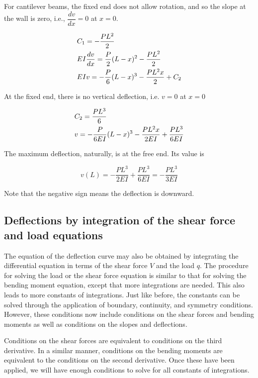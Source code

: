 \documentclass[
fontsize=10pt,
a4paper,
twosides=false,
open=any,
svgnames,
]{kaobook} %
\begin{document}
\begin{example}
For cantilever beams, the fixed end does not allow rotation, and so the slope at the wall is zero, i.e., $\dfrac{dv}{dx} = 0$ at $x = 0$.

\begin{gather*}
  C_1 =  - \frac{PL^2}{2} \hfill \\
  EI\frac{dv}{dx} = \frac{P}{2}(L - x)^2 - \frac{PL^2}{2} \hfill \\
  EIv =  - \frac{P}{6}{(L - x)^3} - \frac{PL^2x}{2} + C_2 \hfill
\end{gather*}

At the fixed end, there is no vertical deflection, i.e. $v = 0$ at $x = 0$

\begin{gather*}
  C_2 = \frac{PL^3}{6} \hfill \\
  v =  - \frac{P}{6EI}(L - x)^3 - \frac{PL^2x}{2EI} + \frac{PL^3}{6EI} \hfill \\ 
\end{gather*}

The maximum deflection, naturally, is at the free end. Its value is

\[v(L) =  - \frac{PL^3}{2EI} + \frac{PL^3}{6EI} =  - \frac{PL^3}{3EI}\]

Note that the negative sign means the deflection is downward.
\end{example}

\subsection{Deflections by integration of the shear force and load equations}

The equation of the deflection curve may also be obtained by integrating the differential equation in terms of the shear force $V$ and the load $q$. The procedure for solving the load or the shear force equation is similar to that for solving the bending moment equation, except that more integrations are needed. This also leads to more constants of integrations. Just like before, the constants can be solved through the application of boundary, continuity, and symmetry conditions. However, these conditions now include conditions on the shear forces and bending moments as well as conditions on the slopes and deflections.

Conditions on the shear forces are equivalent to conditions on the third derivative. In a similar manner, conditions on the bending moments are equivalent to the conditions on the second derivative. Once these have been applied, we will have enough conditions to solve for all constants of integrations.
\end{document}
